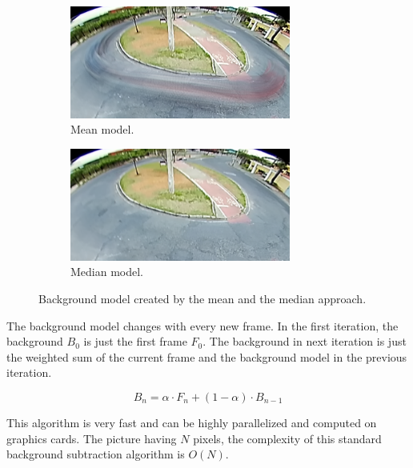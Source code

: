 \documentclass[a4paper,12pt,titlepage, twoside]{article}
\numberwithin{figure}{section}
\begin{document}
\begin{figure}
    \begin{subfigure}[Sample1]{0.5\linewidth}
        \includegraphics[height=37mm]{fig/background_mean_crop.png}
        \caption{Mean model.}
        \label{fig:cut_mean}
    \end{subfigure}
    \qquad
    \begin{subfigure}[Sample1]{0.5\linewidth}    
        \includegraphics[height=37mm]{fig/background_med_crop.png}  
        \caption{Median model.}
        \label{fig:cut_med}  
    \end{subfigure} 
    \caption{Background model created by the mean and the median approach.}
\end{figure}

The background model changes with every new frame. In the first iteration, the background $B_0$ is just the first frame $F_0$. The background in next iteration is just the weighted sum of the  current frame and the background model in the previous iteration.

\begin{equation}
B_n = \alpha \cdot F_n + (1 - \alpha) \cdot B_{n-1}
\end{equation}

This algorithm is very fast and can be highly parallelized and computed on graphics cards. The picture having $N$  pixels, the complexity of this standard background subtraction algorithm is  $O(N)$.
\end{document}
